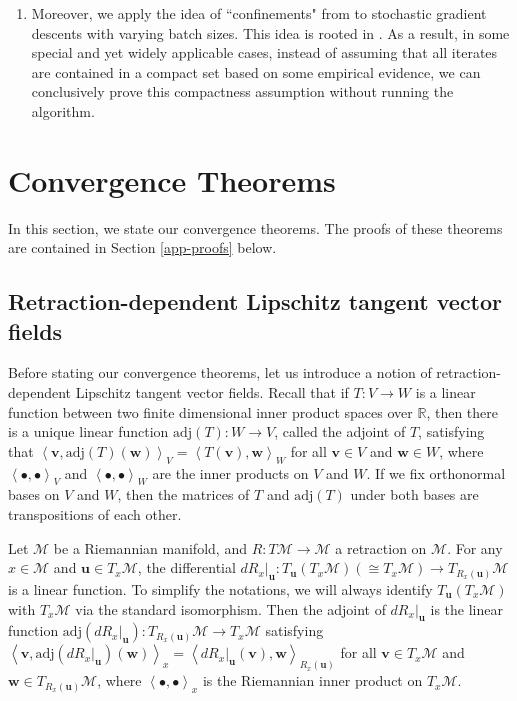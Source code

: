 \documentclass{amsart}
\newcommand{\R}{\mathbb{R}}
\newcommand{\M}{\mathcal{M}}
\newcommand{\adj}{\mathrm{adj}}
\theoremstyle{plain}
\theoremstyle{definition}
\theoremstyle{remark}
\numberwithin{theorem}{section}
\numberwithin{equation}{section}
\begin{document}
\begin{enumerate}
	\item Moreover, we apply the idea of ``confinements" from \cite{XYW-2024,YXW-2024} to stochastic gradient descents with varying batch sizes. This idea is rooted in \cite{Bonnabel,Bottou}. As a result, in some special and yet widely applicable cases, instead of assuming that all iterates are contained in a compact set based on some empirical evidence, we can conclusively prove this compactness assumption without running the algorithm. 
\end{enumerate}



\section{Convergence Theorems}\label{sec-THM}

In this section, we state our convergence theorems. The proofs of these theorems are contained in Section \ref{app-proofs} below.

\subsection{Retraction-dependent Lipschitz tangent vector fields}

Before stating our convergence theorems, let us introduce a notion of retraction-dependent Lipschitz tangent vector fields. Recall that if $T:V\rightarrow W$ is a linear function between two finite dimensional inner product spaces over $\R$, then there is a unique linear function $\adj(T):W \rightarrow V$, called the adjoint of $T$, satisfying that $\left\langle \mathbf{v}, \adj(T)(\mathbf{w})\right\rangle_V = \left\langle T(\mathbf{v}), \mathbf{w}\right\rangle_W$ for all $\mathbf{v} \in V$ and $\mathbf{w} \in W$, where $\left\langle \bullet, \bullet\right\rangle_V$ and $\left\langle \bullet, \bullet\right\rangle_W$ are the inner products on $V$ and $W$. If we fix orthonormal bases on $V$ and $W$, then the matrices of $T$ and $\adj(T)$ under both bases are transpositions of each other.

Let $\M$ be a Riemannian manifold, and $R:T\M \rightarrow \M$ a retraction on $\M$. For any $x \in \M$ and $\mathbf{u} \in T_x\M$, the differential $dR_x|_{\mathbf{u}}:T_{\mathbf{u}}(T_x\M) (\cong T_x\M) \rightarrow T_{R_x(\mathbf{u})} \M$ is a linear function. To simplify the notations, we will always identify $T_{\mathbf{u}}(T_x\M)$ with $T_x\M$ via the standard isomorphism. Then the adjoint of $dR_x|_{\mathbf{u}}$ is the linear function $\adj(dR_x|_{\mathbf{u}}): T_{R_x(\mathbf{u})} \M \rightarrow T_x \M$ satisfying $\left\langle \mathbf{v}, \adj(dR_x|_{\mathbf{u}})(\mathbf{w})\right\rangle_x = \left\langle dR_x|_{\mathbf{u}}(\mathbf{v}), \mathbf{w}\right\rangle_{R_x(\mathbf{u})}$ for all $\mathbf{v} \in T_x\M$ and $\mathbf{w} \in T_{R_x(\mathbf{u})} \M$, where $\left\langle \bullet, \bullet\right\rangle_x$ is the Riemannian inner product on $T_x \M$.
\end{document}
